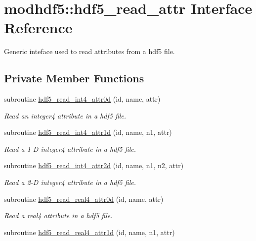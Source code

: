 \hypertarget{interfacemodhdf5_1_1hdf5__read__attr}{\section{modhdf5\-:\-:hdf5\-\_\-read\-\_\-attr Interface Reference}
\label{interfacemodhdf5_1_1hdf5__read__attr}
}


Generic inteface used to read attributes from a hdf5 file.  


\subsection*{Private Member Functions}
\begin{DoxyCompactItemize}
\item 
subroutine \hyperlink{interfacemodhdf5_1_1hdf5__read__attr_a8f911e83ea7fd98d6198490ba5fed12c}{hdf5\-\_\-read\-\_\-int4\-\_\-attr0d} (id, name, attr)
\begin{DoxyCompactList}\small\item\em Read an integer4 attribute in a hdf5 file. \end{DoxyCompactList}\item 
subroutine \hyperlink{interfacemodhdf5_1_1hdf5__read__attr_afa020293ebd3115b68cbe1fdfa312c4c}{hdf5\-\_\-read\-\_\-int4\-\_\-attr1d} (id, name, n1, attr)
\begin{DoxyCompactList}\small\item\em Read a 1-\/\-D integer4 attribute in a hdf5 file. \end{DoxyCompactList}\item 
subroutine \hyperlink{interfacemodhdf5_1_1hdf5__read__attr_a455abe5ff52b1fae1e547aebd0c94875}{hdf5\-\_\-read\-\_\-int4\-\_\-attr2d} (id, name, n1, n2, attr)
\begin{DoxyCompactList}\small\item\em Read a 2-\/\-D integer4 attribute in a hdf5 file. \end{DoxyCompactList}\item 
subroutine \hyperlink{interfacemodhdf5_1_1hdf5__read__attr_ae31cf266133a70be9c4eaa7853b48b19}{hdf5\-\_\-read\-\_\-real4\-\_\-attr0d} (id, name, attr)
\begin{DoxyCompactList}\small\item\em Read a real4 attribute in a hdf5 file. \end{DoxyCompactList}\item 
subroutine \hyperlink{interfacemodhdf5_1_1hdf5__read__attr_abf02aaadb611874adb1b0129be1c0d5c}{hdf5\-\_\-read\-\_\-real4\-\_\-attr1d} (id, name, n1, attr)

\end{DoxyCompactItemize}
